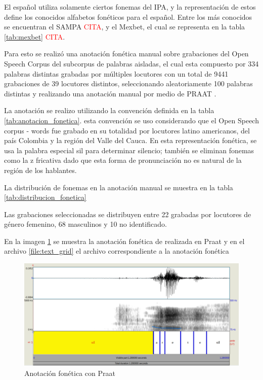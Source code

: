 \documentclass[a4paper,12pt,twoside]{report}
\begin{document}




El español utiliza solamente ciertos fonemas del IPA, y la representación de estos define los conocidos alfabetos fonéticos para el español. Entre los más conocidos se encuentran el SAMPA \textcolor{red}{CITA}, y el Mexbet, el cual se representa en la tabla \ref{tab:mexbet}  \textcolor{red}{CITA}.



Para esto se realizó una anotación fonética manual sobre grabaciones del Open Speech Corpus \cite{Collazos2015} del subcorpus de palabras aisladas, el cual esta compuesto por 334 palabras distintas grabadas por múltiples locutores con un total de 9441 grabaciones de 39 locutores distintos, seleccionando aleatoriamente 100 palabras distintas y realizando una anotación manual por medio de PRAAT \cite{Praat}.

La anotación se realizo utilizando la convención definida en la tabla \ref{tab:anotacion_fonetica}. esta convención se uso considerando que el Open Speech corpus - words fue grabado en su totalidad por locutores latino americanos, del país Colombia y la región del Valle del Cauca. En esta representación fonética, se usa la palabra especial sil para determinar silencio; también se eliminan fonemas como la z fricativa dado que esta forma de pronunciación no es natural de la región de los hablantes.




La distribución de fonemas en la anotación manual se muestra en la tabla \ref{tab:distribucion_fonetica}



Las grabaciones seleccionadas se distribuyen entre 22 grabadas por locutores de género femenino, 68 masculinos y 10 no identificado.

En la imagen \ref{img:anotacion_fonetica_praat} se muestra la anotación fonética de realizada en Praat y en el archivo \ref{file:text_grid} el archivo correspondiente a la anotación fonética



\begin{figure}[H]
\caption{Anotación fonética con Praat}
\label{img:anotacion_fonetica_praat}
\includegraphics[width=\textwidth]{imagenes/03_01_anotacion_fonetica.png}
\end{figure}
\end{document}
